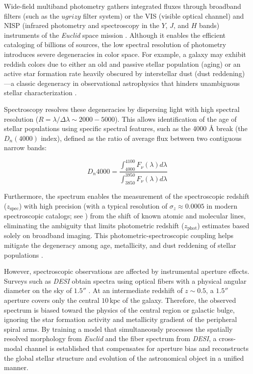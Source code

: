 Wide-field multiband photometry gathers integrated fluxes through broadband filters (such as the $ugrizy$ filter system) or the VIS (visible optical channel) and NISP (infrared photometry and spectroscopy in the $Y$, $J$, and $H$ bands) instruments of the \textit{Euclid} space mission \autocites{ar:mellier-2024}{ar:cropper-2024}{ar:jahnke-2025}. Although it enables the efficient cataloging of billions of sources, the low spectral resolution of photometry introduces severe degeneracies in color space. For example, a galaxy may exhibit reddish colors due to either an old and passive stellar population (aging) or an active star formation rate heavily obscured by interstellar dust (dust reddening)—a classic degeneracy in observational astrophysics that hinders unambiguous stellar characterization \autocites{ar:worthey-1994}{ar:conroy-2013}.

Spectroscopy resolves these degeneracies by dispersing light with high spectral resolution ($R = \lambda/\Delta\lambda \sim 2000 - 5000$). This allows identification of the age of stellar populations using specific spectral features, such as the 4000 $\si{\angstrom}$ break (the $D_n\left(4000\right)$ index), defined as the ratio of average flux between two contiguous narrow bands:

\begin{equation}
D_n 4000 = \dfrac{\int_{4000}^{4100} F_{\nu}\left(\lambda\right) d\lambda}{\int_{3850}^{3950} F_{\nu}\left(\lambda\right) d\lambda}
\label{eq:dn4000}
\end{equation}

Furthermore, the spectrum enables the measurement of the spectroscopic redshift ($z_{\text{spec}}$) with high precision (with a typical resolution of $\sigma_z \approx 0.0005$ in modern spectroscopic catalogs; see \textcite{ar:desi-early-release}) from the shift of known atomic and molecular lines, eliminating the ambiguity that limits photometric redshift ($z_{\text{phot}}$) estimates based solely on broadband imaging. This photometric-spectroscopic coupling helps mitigate the degeneracy among age, metallicity, and dust reddening of stellar populations \autocites{ar:balogh-1999}{ar:desi-early-release}.

However, spectroscopic observations are affected by instrumental aperture effects. Surveys such as \textit{\gls{DESI}} obtain spectra using optical fibers with a physical angular diameter on the sky of $1.5''$ \autocite{ar:desi-early-release}. At an intermediate redshift of $z \sim 0.5$, a $1.5''$ aperture covers only the central $10\,\text{kpc}$ of the galaxy. Therefore, the observed spectrum is biased toward the physics of the central region or galactic bulge, ignoring the star formation activity and metallicity gradient of the peripheral spiral arms. By training a model that simultaneously processes the spatially resolved morphology from \textit{Euclid} and the fiber spectrum from \textit{\gls{DESI}}, a cross-modal channel is established that compensates for aperture bias and reconstructs the global stellar structure and evolution of the astronomical object in a unified manner.

